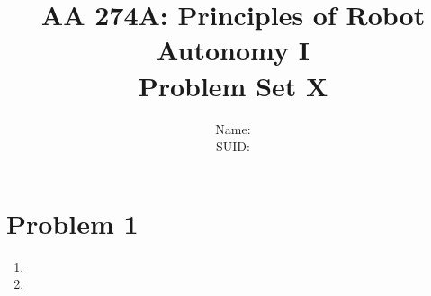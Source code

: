 \documentclass{article}
\title{AA 274A: Principles of Robot Autonomy I \\ Problem Set X}
\author{Name:      \\ SUID:}
\date{}
\begin{document}
\maketitle
\pagestyle{fancy} 

\section*{Problem 1}
\begin{enumerate}[label=(\roman*)]
\item
\item

\end{enumerate}
\end{document}
